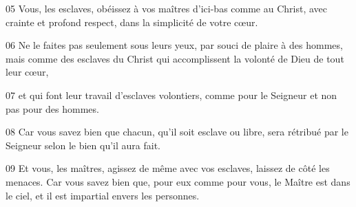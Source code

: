 
05 Vous, les esclaves, obéissez à vos maîtres d’ici-bas comme au Christ, avec crainte et profond respect, dans la simplicité de votre cœur.

06 Ne le faites pas seulement sous leurs yeux, par souci de plaire à des hommes, mais comme des esclaves du Christ qui accomplissent la volonté de Dieu de tout leur cœur,

07 et qui font leur travail d’esclaves volontiers, comme pour le Seigneur et non pas pour des hommes.

08 Car vous savez bien que chacun, qu’il soit esclave ou libre, sera rétribué par le Seigneur selon le bien qu’il aura fait.

09 Et vous, les maîtres, agissez de même avec vos esclaves, laissez de côté les menaces. Car vous savez bien que, pour eux comme pour vous, le Maître est dans le ciel, et il est impartial envers les personnes.

